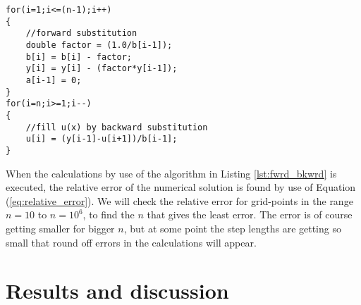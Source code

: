 \documentclass[12pt]{article}
\begin{document}
\begin{flushleft}
\begin{center}
\begin{lstlisting}[label={lst:fwrd_bkwrd}]
for(i=1;i<=(n-1);i++)
{
	//forward substitution
	double factor = (1.0/b[i-1]);
	b[i] = b[i] - factor;
	y[i] = y[i] - (factor*y[i-1]);
	a[i-1] = 0;
}
for(i=n;i>=1;i--)
{
	//fill u(x) by backward substitution
	u[i] = (y[i-1]-u[i+1])/b[i-1];
}
\end{lstlisting}
\end{center}
\newpage
When the calculations by use of the algorithm in Listing \ref{lst:fwrd_bkwrd} is executed, the relative error of the numerical solution is found by use of Equation (\ref{eq:relative_error}). We will check the relative error for grid-points in the range $n=10$ to $n=10^6$, to find the $n$ that gives the least error. The error is of course getting smaller for bigger $n$, but at some point the step lengths are getting so small that round off errors in the calculations will appear.

\section*{Results and discussion}

\end{flushleft}
\end{document}
